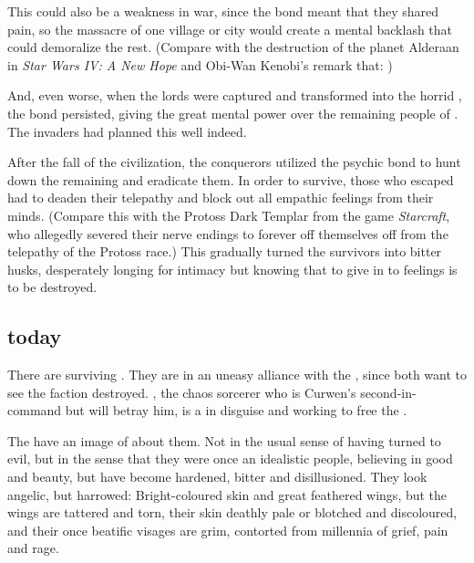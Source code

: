 This could also be a weakness in war, since the bond meant that they shared pain, so the massacre of one \Kezeradi{} village or city would create a mental backlash that could demoralize the rest. (Compare with the destruction of the planet Alderaan in \emph{Star Wars IV: A New Hope} and Obi-Wan Kenobi's remark that: )

And, even worse, when the \Kezeradi{} lords were captured and transformed into the horrid \Sephiroth, the bond persisted, giving the \Sephiroth{} great mental power over the remaining people of \Kezerad. The invaders had planned this well indeed. 

After the fall of the \Kezeradi{} civilization, the conquerors utilized the psychic bond to hunt down the remaining \Kezeradi{} and eradicate them. In order to survive, those who escaped had to deaden their telepathy and block out all empathic feelings from their minds. (Compare this with the Protoss Dark Templar from the game \emph{Starcraft}, who allegedly severed their nerve endings to forever off themselves off from the telepathy of the Protoss race.) This gradually turned the survivors into bitter husks, desperately longing for intimacy but knowing that to give in to feelings is to be destroyed. 








\subsection{\Kezeradi{} today}
There are surviving \Kezeradi. They are in an uneasy alliance with the \cuezcans, since both want to see the \bane{} faction destroyed. \Saynor, the \scathaese{} chaos sorcerer who is Curwen's second-in-command but will betray him, is a \cuezcan{} in disguise and working to free the \Sephiroth. 

The \Kezeradi{} have an image of  about them. Not  in the usual sense of having turned to evil, but in the sense that they were once an idealistic people, believing in good and beauty, but have become hardened, bitter and disillusioned. They look angelic, but harrowed: Bright-coloured skin and great feathered wings, but the wings are tattered and torn, their skin deathly pale or blotched and discoloured, and their once beatific visages are grim, contorted from millennia of grief, pain and rage. 







